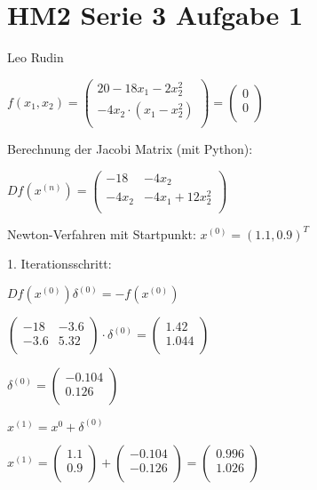 \documentclass{article}
\begin{document}
\section*{HM2 Serie 3 Aufgabe 1}
Leo Rudin

\(f(x_1,x_2) = 
\begin{pmatrix}
20-18x_1-2x_2^2\\
-4x_2\cdot (x_1-x_2^2)\\
\end{pmatrix}
=
\begin{pmatrix}
0\\
0\\
\end{pmatrix}
\)

Berechnung der Jacobi Matrix (mit Python):

\(
Df(x^{(n)}) =
\begin{pmatrix}
-18 & -4x_2\\
-4x_2 & -4x_1 + 12x_2^2\\
\end{pmatrix}
\)

Newton-Verfahren mit Startpunkt: \(x^{(0)} = (1.1,0.9)^T\)

1. Iterationsschritt:

\(Df(x^{(0)})\delta^{(0)} = -f(x^{(0)})\)

\(
\begin{pmatrix}
-18 & -3.6\\
-3.6 & 5.32\\
\end{pmatrix}
\cdot
\delta^{(0)}
=
\begin{pmatrix}
1.42\\
1.044\\
\end{pmatrix}
\)

\(
\delta^{(0)}
=
\begin{pmatrix}
-0.104\\
0.126\\
\end{pmatrix}
\)

\(x^{(1)} = x^{0} + \delta^{(0)}\)

\(
x^{(1)}
=
\begin{pmatrix}
1.1\\
0.9\\
\end{pmatrix}
+
\begin{pmatrix}
-0.104\\
-0.126\\
\end{pmatrix}
=
\begin{pmatrix}
0.996\\
1.026\\
\end{pmatrix}
\)
\end{document}
